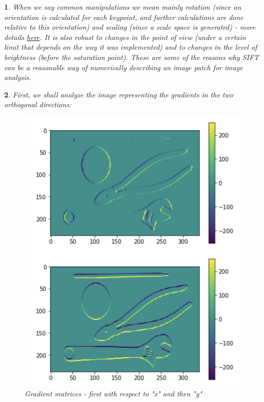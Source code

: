 \documentclass[10pt]{article} %
\theoremstyle{question-style}
\newtheorem{answer}{\arabic{answer}}
\begin{document}
\begin{flushleft}
\begin{answer}
\quad When we say common manipulations we mean mainly rotation (since an orientation is calculated for each keypoint, and further calculations are done relative to this orientation) and scaling (since a scale space is generated) - more details \href{http://aishack.in/tutorials/sift-scale-invariant-feature-transform-introduction/}{\color{blue}\underline{here}}. It is also robust to changes in the point of view (under a certain limit that depends on the way it was implemented) and to changes in the level of brightness (before the saturation point). These are some of the reasons why SIFT can be a reasonable way of numerically describing an image patch for image analysis. 
\end{answer}

\begin{answer}

First, we shall analyze the image representing the gradients in the two orthogonal directions:

\begin{figure}[H]
	\begin{center}
		\includegraphics[scale=0.6]{gradients.png}
	\end{center}
	\caption{Gradient matrices - first with respect to "x" and then "y"}
	\label{fig:gradients}
\end{figure}


\end{answer}
\end{flushleft}
\end{document}
